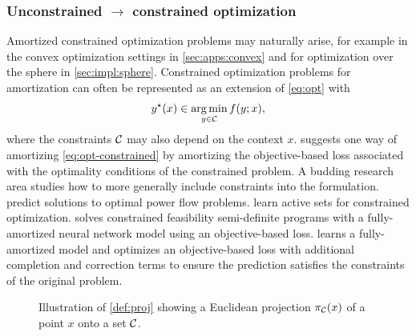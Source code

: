 \subsubsection{Unconstrained $\rightarrow$ constrained optimization}
\label{sec:constraints}
Amortized constrained optimization problems may naturally arise, for example
in the convex optimization settings in \cref{sec:apps:convex}
and for optimization over the sphere in \cref{sec:impl:sphere}.
Constrained optimization problems for amortization can often be represented as
an extension of \cref{eq:opt} with
\begin{equation}
  y^\star(x) \in \operatorname*{arg\,min}_{y\in{\mathcal{C}}} f(y; x),
  \label{eq:opt-constrained}
\end{equation}
where the constraints ${\mathcal{C}}$ may also depend on the context $x$.
 suggests one way of amortizing
\cref{eq:opt-constrained} by amortizing the objective-based loss
associated with the optimality conditions of the constrained problem.
A budding research area studies how to more generally include
constraints into the formulation.
\citet{baker2019learning,dong2020smart,zamzam2020learning,pan2020deepopf,klamkin2025dualinteriorpointoptimization,vanhentenryck2025optimizationlearning}
predict solutions to optimal power flow problems.
\citet{misra2021learning} learn active sets for constrained optimization.
\citet{krivachy2020fast} solves constrained feasibility semi-definite programs
with a fully-amortized neural network model using an
objective-based loss.
\citet{donti2021dc3} learns a fully-amortized model and optimizes an
objective-based loss with additional completion and correction terms
to ensure the prediction satisfies the constraints of the original problem.


\begin{figure}[t]
  \centering
  \label{fig:projection}
  \caption{Illustration of \cref{def:proj} showing
    a Euclidean projection $\pi_{\mathcal{C}}(x)$ of a point $x$
    onto a set ${\mathcal{C}}$.}
\end{figure}


